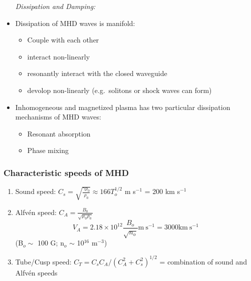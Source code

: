 \documentclass{article}
\begin{document}
\begin{itemize}
\emph{Dissipation and Damping:}

    \item Dissipation of MHD waves is manifold:
        \begin{itemize}
            \item Couple with each other
            \item interact non-linearly
            \item resonantly interact with the closed waveguide
            \item devolop non-linearly (e.g.\ solitons or shock waves
                can form)
        \end{itemize}
    \item Inhomogeneous and magnetized plasma has two particular
        dissipation mechanisms of MHD waves:
        \begin{itemize}
            \item Resonant absorption
            \item Phase mixing
        \end{itemize}
\end{itemize}

\subsubsection{Characteristic speeds of MHD}
\begin{enumerate}
    \item Sound speed: $C_{s} = \sqrt{\frac{\gamma p_{0}}{\rho_{0}}}
            \approx 166 T_{o}^{1/2}$ m s$^{-1}$ = 200 km s$^{-1}$
    \item Alfv\'en speed: $C_{A} = \frac{B_{0}}{\sqrt{\mu_{0}\rho_{0}}}$
        \[
            V_{A} = 2.18\times10^{12}\frac{B_o}{\sqrt{n_o}}
            \textrm{m}\ \textrm{s}^{-1} = 3000 \textrm{km}\ \textrm{s}^{-1}
            \]
        (B$_{o} \sim$ 100 G; n$_{o}$ $\sim$ 10$^{16}$ m$^{-3}$)
    \item Tube/Cusp speed:
        $C_{T} = C_{s}C_{A}/\left(C_{A}^{2} + C_{s}^{2}\right)^{1/2}$
        = combination of sound and Alfv\'en speeds
\end{enumerate}
\end{document}
